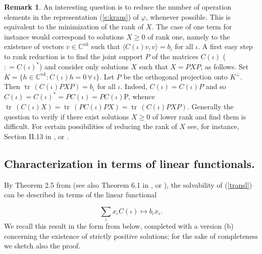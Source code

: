 \documentclass[12pt]{amsart}
\theoremstyle{definition}
\newtheorem{remark}[theorem]{Remark}
\begin{document}
\begin{remark} {\rm
An interesting question is to reduce the number of operation elements in the representation (\ref{e:kraus}) of  $\varphi$, whenever possible.
This is equivalent to the minimization of the rank of  $X$. The case of one term for instance would correspond to  solutions $X\geq 0$  of rank one, namely to the existence of vectors $v\in \mathbb{C}^{nk}$ such that $\langle C(\iota ) v,v\rangle =b_\iota$ for all $\iota$. 
A first easy step to rank reduction  is to find the joint support $P$ of the matrices $C(\iota )$ ($: =C({\iota})^*$) and consider only solutions $X$ such that $X=PXP$, as follows.
 Set $K=\{ h\in \mathbb{C}^{nk}: C(\iota )h=0\, \forall \, \iota \}$. Let $P$ be the orthogonal projection onto $K^\bot $. Then ${\operatorname{tr}}\, (C(\iota )PXP)=
b_\iota$ for all $\iota$. Indeed, $C(\iota )=C(\iota )P$ and so $C(\iota )=C({\iota})^* =PC(\iota )=PC(\iota )$P, whence ${\operatorname{tr}}\, (C(\iota )X)={\operatorname{tr}}\, (PC(\iota )P X)={\operatorname{tr}}\, (C(\iota )PXP)$. Generally the question to verify if there exist solutions $X\geq 0$ of lower rank and find them is difficult.
 For certain possibilities of reducing  the rank of $X$ see, for instance, Section II.13
 in \cite{Barvinok}, or \cite{SadatiYousefi}.}
\end{remark}

\subsection{Characterization in terms of linear functionals.}\label{ss:ctlf}
By  Theorem 2.5 from \cite{prima} (see also Theorem 6.1 in \cite{Pau}, or \cite{SmithWard}), the 
solvability of (\ref{transl}) can be described  in terms of the linear functional

$$\sum_\iota x_\iota C(\iota ) \mapsto b_\iota x_\iota .$$ 
We recall  this result in the  form from below,   completed with a version (b) 
concerning the existence of strictly positive solutions; 
for the sake of completeness we sketch also  the proof. 
\end{document}
